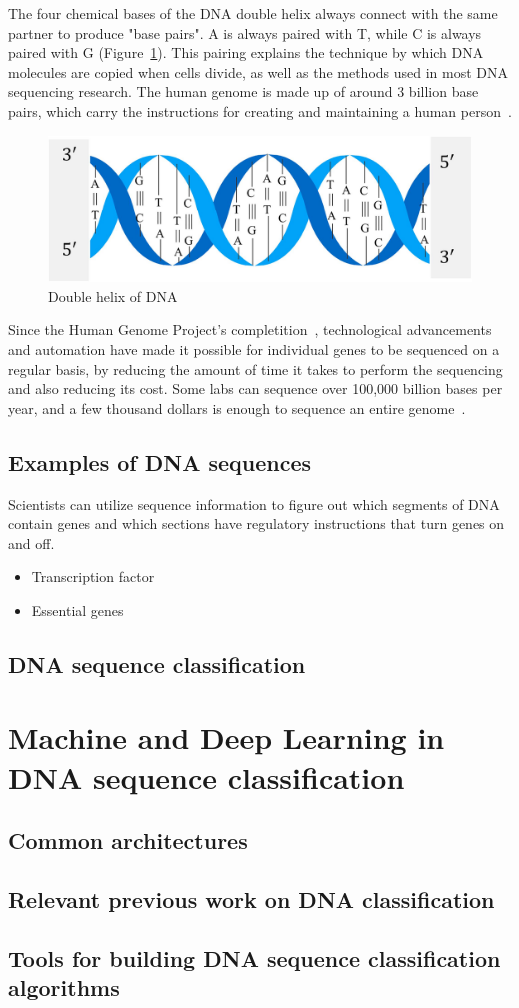 The four chemical bases of the DNA double helix always connect with the same partner to produce "base pairs". \gls{A} is always paired with \gls{T}, while \gls{C} is always paired with \gls{G} (Figure~\ref{fig:dna}). This pairing explains the technique by which DNA molecules are copied when cells divide, as well as the methods used in most DNA sequencing research. The human genome is made up of around 3 billion base pairs, which carry the instructions for creating and maintaining a human person~\cite{2020DNASheet}.

\begin{figure}[htbp]
    \centering
    \includegraphics[width=0.5\linewidth]{Chapters/Figures/dna.jpg}
    \caption{Double helix of DNA~\cite{Yang2020ReviewDNA}}
    \label{fig:dna}
\end{figure}


Since the Human Genome Project's completition~\cite{TheProject}, technological advancements and automation have made it possible for individual genes to be sequenced on a regular basis, by reducing the amount of time it takes to perform the sequencing and also reducing its cost. Some labs can sequence over 100,000 billion bases per year, and a few thousand dollars is enough to sequence an entire genome~\cite{2020DNASheet}. 

\subsection{Examples of DNA sequences}

Scientists can utilize sequence information to figure out which segments of DNA contain genes and which sections have regulatory instructions that turn genes on and off.

\begin{itemize}
    \item Transcription factor
    \item Essential genes
\end{itemize}

\subsection{DNA sequence classification}


\section{Machine and Deep Learning in DNA sequence classification} \label{sec:ml_dl_dna}

\subsection{Common architectures}

\subsection{Relevant previous work on DNA classification}

\subsection{Tools for building DNA sequence classification algorithms}

